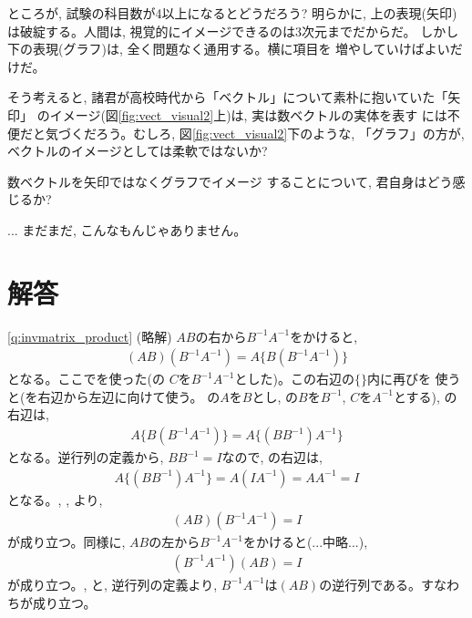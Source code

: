 ところが, 試験の科目数が4以上になるとどうだろう? 明らかに, 上の表現(矢印)
は破綻する。人間は, 視覚的にイメージできるのは3次元までだからだ。
しかし下の表現(グラフ)は, 全く問題なく通用する。横に項目を
増やしていけばよいだけだ。

そう考えると, 諸君が高校時代から「ベクトル」について素朴に抱いていた「矢印」
のイメージ(図\ref{fig:vect_visual2}上)は, 実は数ベクトルの実体を表す
には不便だと気づくだろう。むしろ, 図\ref{fig:vect_visual2}下のような, 
「グラフ」の方が, ベクトルのイメージとしては柔軟ではないか? 

\begin{q}\label{q:vect_image2} 数ベクトルを矢印ではなくグラフでイメージ
することについて, 君自身はどう感じるか?\end{q}

\begin{faq}{\small{}... まだまだ, こんなもんじゃありません。}\end{faq}


\section{解答}


\ref{q:invmatrix_product} (略解) $AB$の右から$B^{-1}A^{-1}$をかけると, 
\begin{eqnarray}
(AB)(B^{-1}A^{-1})=A\{B(B^{-1}A^{-1})\}\label{q:invmatrix_product_2}
\end{eqnarray}
となる。ここでを使った(の
$C$を$B^{-1}A^{-1}$とした)。この右辺の$\{\}$内に再びを
使うと(を右辺から左辺に向けて使う。
の$A$を$B$とし, の$B$を$B^{-1}$, $C$を$A^{-1}$とする), 
の右辺は, 
\begin{eqnarray}
A\{B(B^{-1}A^{-1})\}=A\{(BB^{-1})A^{-1}\}\label{q:invmatrix_product_4}
\end{eqnarray}
となる。逆行列の定義から, $BB^{-1}=I$なので, の右辺は, 
\begin{eqnarray}
A\{(BB^{-1})A^{-1}\}=A(IA^{-1})=AA^{-1}=I\label{q:invmatrix_product_6}
\end{eqnarray}
となる。, , 
より, 
\begin{eqnarray}
(AB)(B^{-1}A^{-1})=I\label{q:invmatrix_product_8}
\end{eqnarray}
が成り立つ。同様に, $AB$の左から$B^{-1}A^{-1}$をかけると(...中略...), 
\begin{eqnarray}
(B^{-1}A^{-1})(AB)=I\label{q:invmatrix_product_9}
\end{eqnarray}
が成り立つ。, と, 
逆行列の定義より, $B^{-1}A^{-1}$は$(AB)$の逆行列である。すなわちが成り立つ。\\


